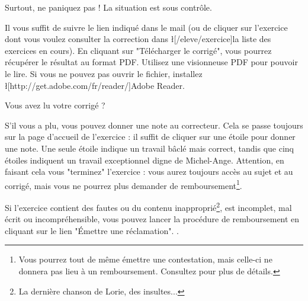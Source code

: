 ﻿Surtout, ne paniquez pas ! La situation est sous contrôle.

Il vous suffit de suivre le lien indiqué dans le mail (ou de cliquer sur l'exercice dont vous voulez consulter la correction dans  \l[/eleve/exercice]{la liste des exercices en cours}).
En cliquant sur "Télécharger le corrigé", vous pourrez récupérer le résultat au format PDF. Utilisez une visionneuse PDF pour pouvoir le lire. Si vous ne pouvez pas ouvrir le fichier, installez \l[http://get.adobe.com/fr/reader/]{Adobe Reader}.

Vous avez lu votre corrigé ?
\item S'il vous a plu, vous pouvez donner une note au correcteur. Cela se passe toujours sur la page d'accueil de l'exercice : il suffit de cliquer sur une étoile pour donner une note. Une seule étoile indique un travail bâclé mais correct, tandis que cinq étoiles indiquent un travail exceptionnel digne de Michel-Ange. Attention, en faisant cela vous "terminez" l'exercice : vous aurez toujours accès au sujet et au corrigé, mais vous ne pourrez plus demander de remboursement\footnote{Vous pourrez tout de même émettre une contestation, mais celle-ci ne donnera pas lieu à un remboursement. Consultez  pour plus de détails.}.
\item Si l'exercice contient des fautes ou du contenu inapproprié\footnote{La dernière chanson de Lorie, des insultes...}, est incomplet, mal écrit ou incompréhensible, vous pouvez lancer la procédure de remboursement en cliquant sur le lien "Émettre une réclamation". .